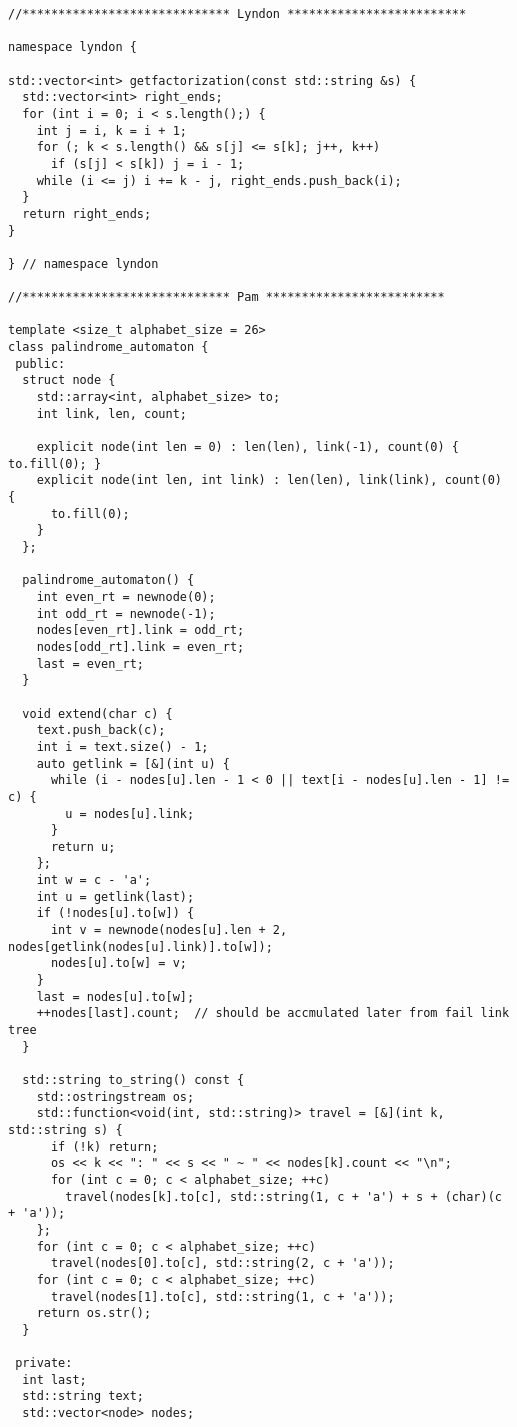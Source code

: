 \documentclass{article}
\begin{document}
\begin{lstlisting}
//***************************** Lyndon *************************

namespace lyndon {

std::vector<int> getfactorization(const std::string &s) {
  std::vector<int> right_ends;
  for (int i = 0; i < s.length();) {
    int j = i, k = i + 1;
    for (; k < s.length() && s[j] <= s[k]; j++, k++)
      if (s[j] < s[k]) j = i - 1;
    while (i <= j) i += k - j, right_ends.push_back(i);
  }
  return right_ends;
}

} // namespace lyndon

//***************************** Pam *************************

template <size_t alphabet_size = 26>
class palindrome_automaton {
 public:
  struct node {
    std::array<int, alphabet_size> to;
    int link, len, count;

    explicit node(int len = 0) : len(len), link(-1), count(0) { to.fill(0); }
    explicit node(int len, int link) : len(len), link(link), count(0) {
      to.fill(0);
    }
  };

  palindrome_automaton() {
    int even_rt = newnode(0);
    int odd_rt = newnode(-1);
    nodes[even_rt].link = odd_rt;
    nodes[odd_rt].link = even_rt;
    last = even_rt;
  }

  void extend(char c) {
    text.push_back(c);
    int i = text.size() - 1;
    auto getlink = [&](int u) {
      while (i - nodes[u].len - 1 < 0 || text[i - nodes[u].len - 1] != c) {
        u = nodes[u].link;
      }
      return u;
    };
    int w = c - 'a';
    int u = getlink(last);
    if (!nodes[u].to[w]) {
      int v = newnode(nodes[u].len + 2, nodes[getlink(nodes[u].link)].to[w]);
      nodes[u].to[w] = v;
    }
    last = nodes[u].to[w];
    ++nodes[last].count;  // should be accmulated later from fail link tree
  }

  std::string to_string() const {
    std::ostringstream os;
    std::function<void(int, std::string)> travel = [&](int k, std::string s) {
      if (!k) return;
      os << k << ": " << s << " ~ " << nodes[k].count << "\n";
      for (int c = 0; c < alphabet_size; ++c)
        travel(nodes[k].to[c], std::string(1, c + 'a') + s + (char)(c + 'a'));
    };
    for (int c = 0; c < alphabet_size; ++c)
      travel(nodes[0].to[c], std::string(2, c + 'a'));
    for (int c = 0; c < alphabet_size; ++c)
      travel(nodes[1].to[c], std::string(1, c + 'a'));
    return os.str();
  }

 private:
  int last;
  std::string text;
  std::vector<node> nodes;


\end{lstlisting}
\end{document}
